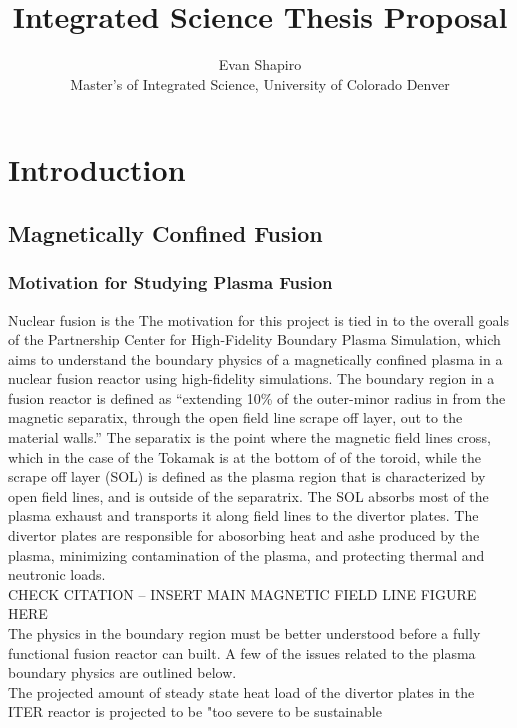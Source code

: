 \documentclass{article}
\title{Integrated Science Thesis Proposal}
\author{Evan Shapiro \\ Master's of Integrated Science, University of Colorado Denver}
\begin{document}
\maketitle
\tableofcontents
\section{Introduction}
\subsection{Magnetically Confined Fusion}
\subsubsection{Motivation for Studying Plasma Fusion}

Nuclear fusion is the 
The motivation for this project is tied in to the overall goals of the Partnership Center for High-Fidelity Boundary Plasma Simulation, which aims to understand the boundary physics of a magnetically confined plasma in a nuclear fusion reactor using high-fidelity simulations. The boundary region in a fusion reactor is defined as “extending 10\% of the outer-minor radius in from the magnetic separatix, through the open field line scrape off layer, out to the material walls.” The separatix is the point where the magnetic field lines cross, which in the case of the Tokamak is at the bottom of of the toroid, while the scrape off layer (SOL) is defined as the plasma region that is characterized by open field lines, and is outside of the separatrix. The SOL absorbs most of the plasma exhaust and transports it along field lines to the divertor plates. The divertor plates are responsible for abosorbing heat and ashe produced by the plasma, minimizing contamination of the plasma, and protecting thermal and neutronic loads.\\

CHECK CITATION – INSERT MAIN MAGNETIC FIELD LINE FIGURE HERE\\

The physics in the boundary region must be better understood before a fully functional fusion reactor can built. A few of the issues related to the plasma boundary physics are outlined below.\\

The projected amount of steady state heat load of the divertor plates in the ITER reactor is projected to be "too severe to be sustainable
\end{document}

